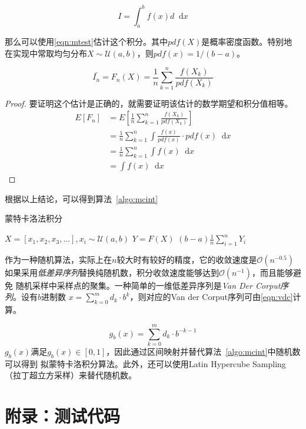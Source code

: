 \documentclass[a4paper,twoside]{article}
\newcommand*{\dif}{\mathop{}\!\mathrm{d}}
\begin{document}
\begin{spacing}{1.2}
\begin{equation}
	\label{eqn:egint}
	I=\int_a^b f(x)d \dif x
\end{equation}

那么可以使用\eqref{eqn:mtest}估计这个积分。其中$pdf(X)$是概率密度函数。特别地
在实现中常取均匀分布$X\sim \mathcal{U}(a,b)$，则$pdf(x)=1/(b-a)$。

\begin{equation}
	\label{eqn:mtest}
	\bar{I_n}=F_n(X)=\frac{1}{n}\sum_{k=1}^n\frac{f(X_k)}{pdf(X_k)}
\end{equation}

\begin{proof}
	要证明这个估计是正确的，就需要证明该估计的数学期望和积分值相等。
\begin{align*}
	E[F_n]&=E\left[\frac{1}{n}\sum_{k=1}^n\frac{f(X_k)}{pdf(X_k)}\right]\\
	&=\frac{1}{n}\sum_{k=1}^n\int \frac{f(x)}{pdf(x)} \cdot pdf(x) \dif x\\
	&=\frac{1}{n}\sum_{k=1}^n\int f(x) \dif x\\
	&=\int f(x) \dif x
\end{align*}
\end{proof}
根据以上结论，可以得到算法~\ref{algo:mcint}

\begin{algorithm}
	\caption{蒙特卡洛法积分}
	\label{algo:mcint}
	\begin{algorithmic}[1]
		
		\State $X=[x_1,x_2,x_3,\ldots], x_i \sim\mathcal{U}(a,b)$
		\State $Y=F(X)$
		\State \Return $(b-a)\frac{1}{n}\sum_{i=1}^nY_i$
		\EndProcedure
	\end{algorithmic}
\end{algorithm}	

作为一种随机算法，实际上在$n$较大时有较好的精度，它的收敛速度是$\mathcal{O}(n^{-0.5})$
如果采用\emph{低差异序列}替换纯随机数，积分收敛速度能够达到$\mathcal{O}(n^{-1})$，而且能够避免
随机采样中采样点的聚集。一种简单的一维低差异序列是\emph{Van Der Corput序列}。设有$b$进制数
$x=\sum_{k=0}^md_k\cdot b^k$，则对应的Van der Corput序列可由\eqref{eqn:vdc}计算。

\begin{equation}
	\label{eqn:vdc}
	g_b(x)=\sum_{k=0}^{m}d_k\cdot b^{-k-1}
\end{equation}
$g_b(x)$满足$g_b(x)\in [0,1]$，因此通过区间映射并替代算法~\ref{algo:mcint}中随机数可以得到
拟蒙特卡洛积分算法。此外，还可以使用Latin Hypercube Sampling（拉丁超立方采样）来替代随机数。

\clearpage

\section{附录：测试代码}
\label{sec:app_code}
\end{spacing}
\end{document}
